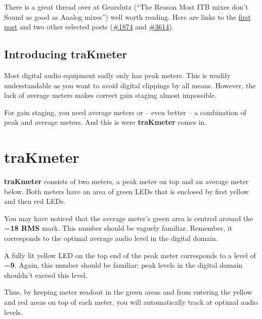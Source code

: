 There is a great thread over at Gearslutz (``The Reason Most ITB mixes
don’t Sound as good as Analog mixes'') well worth reading.  Here are
links to the
\href{http://www.gearslutz.com/board/5062929-post1.html}{first post}
and two other selected posts
(\href{http://www.gearslutz.com/board/5064831-post1874.html}{\#1874}
and
\href{http://www.gearslutz.com/board/5609740-post3614.html}{\#3614}).


\section{Introducing traKmeter}
\label{sec:introducing_trakmeter}

Most digital audio equipment sadly only has peak meters.  This is
readily understandable as you want to avoid digital clippings by all
means.  However, the lack of average meters makes correct gain staging
almost impossible.

For gain staging, you need average meters or -- even better -- a
combination of peak and average meters.  And this is were
\textbf{traKmeter} comes in.

\chapter{traKmeter}
\label{chap:trakmeter}

\textbf{traKmeter} consists of two meters, a peak meter on top and an
average meter below.  Both meters have an area of green LEDs that is
enclosed by first yellow and then red LEDs.

You may have noticed that the average meter's green area is centred
around the \textbf{\SI{-18}{\dBFS} RMS} mark.  This number should be
vaguely familiar.  Remember, it corresponds to the optimal average
audio level in the digital domain.

A fully lit yellow LED on the top end of the peak meter corresponds to
a level of \textbf{\SI{-9}{\dBFS}}.  Again, this number should be
familiar: peak levels in the digital domain shouldn't exceed this
level.

Thus, by keeping meter readout in the green areas and from entering
the yellow and red areas on top of each meter, you will automatically
track at optimal audio levels.

